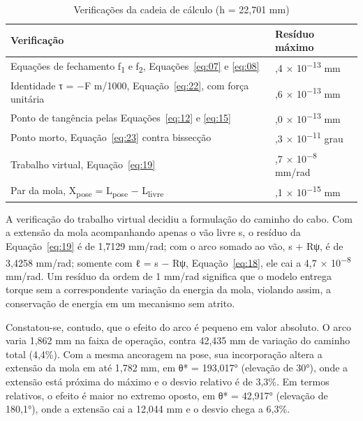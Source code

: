 \begin{table}[!htbp]
\estilotabela{\small}
\caption{Verificações da cadeia de cálculo (h = 22,701 mm)}\label{tab:verificacoes-cadeia-calculo-h}
\begin{tabularx}{\textwidth}{@{}>{\hsize=1.338\hsize\raggedright\arraybackslash}X>{\hsize=0.662\hsize\centering\arraybackslash}X@{}}
\toprule
\centering\textbf{Verificação} & \centering\textbf{Resíduo máximo} \tabularnewline
\midrule
Equações de fechamento f\textsubscript{1} e f\textsubscript{2}, Equações~\eqref{eq:07} e \eqref{eq:08} & 1,4 × 10\textsuperscript{−13} mm \\
Identidade τ = −F m/1000, Equação~\eqref{eq:22}, com força unitária & 1,6 × 10\textsuperscript{−13} mm \\
Ponto de tangência pelas Equações~\eqref{eq:12} e \eqref{eq:15} & 8,0 × 10\textsuperscript{−13} mm \\
Ponto morto, Equação~\eqref{eq:23} contra bissecção & 1,3 × 10\textsuperscript{−11} grau \\
Trabalho virtual, Equação~\eqref{eq:19} & 4,7 × 10\textsuperscript{−8} mm/rad \\
Par da mola, X\textsubscript{pose} = L\textsubscript{pose} − L\textsubscript{livre} & 7,1 × 10\textsuperscript{−15} mm \\
\bottomrule
\end{tabularx}
\end{table}

A verificação do trabalho virtual decidiu a formulação do caminho do cabo. Com a extensão da mola acompanhando apenas o vão livre s, o resíduo da Equação~\eqref{eq:19} é de 1,7129 mm/rad; com o arco somado ao vão, s + Rψ, é de 3,4258 mm/rad; somente com ℓ = s − Rψ, Equação~\eqref{eq:18}, ele cai a 4,7 × 10\textsuperscript{−8} mm/rad. Um resíduo da ordem de 1 mm/rad significa que o modelo entrega torque sem a correspondente variação da energia da mola, violando assim, a conservação de energia em um mecanismo sem atrito.

Constatou-se, contudo, que o efeito do arco é pequeno em valor absoluto. O arco varia 1,862 mm na faixa de operação, contra 42,435 mm de variação do caminho total (4,4\%). Com a mesma ancoragem na pose, sua incorporação altera a extensão da mola em até 1,782 mm, em θ* = 193,017° (elevação de 30°), onde a extensão está próxima do máximo e o desvio relativo é de 3,3\%. Em termos relativos, o efeito é maior no extremo oposto, em θ* = 42,917° (elevação de 180,1°), onde a extensão cai a 12,044 mm e o desvio chega a 6,3\%.

